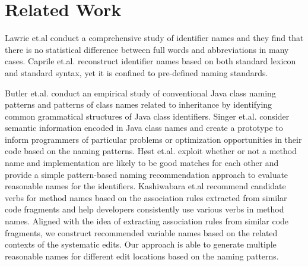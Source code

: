 \section {Related Work}\label{sec:related}

Lawrie et.al \cite{lawrie:studyindentifier06} conduct a  comprehensive study of identifier names  and they find that there is no statistical difference between full words and abbreviations in many cases. Caprile et.al. \cite{caprile:reconstruct00} reconstruct identifier names based on both  standard lexicon and standard syntax, yet it is confined to pre-defined naming standards. 

Butler et.al.  \cite{butler:classname11}  conduct an empirical study of  conventional  Java class naming patterns and patterns of class names related to inheritance by identifying common grammatical structures of Java class identifiers.  Singer et.al. \cite{singer:pattern08} consider semantic information encoded in Java class names  and create  a prototype to inform programmers of particular problems or optimization opportunities in their code based on the naming patterns.
H{\o}st et.al. \cite{einar:debugname09} exploit  whether or not a method name and implementation are likely to be good matches for each other and provide a simple pattern-based naming recommendation approach to evaluate reasonable names for the identifiers.  Kashiwabara et.al \cite{yuki:verbrecommend14} recommend candidate verbs for method names based on the association rules extracted from similar code fragments and help developers consistently use various verbs in method names. Aligned with the idea of extracting association rules from similar code fragments, we construct recommended variable names based on the related contexts of the systematic edits. Our approach is able to generate multiple reasonable names for different edit locations based on the naming patterns.



